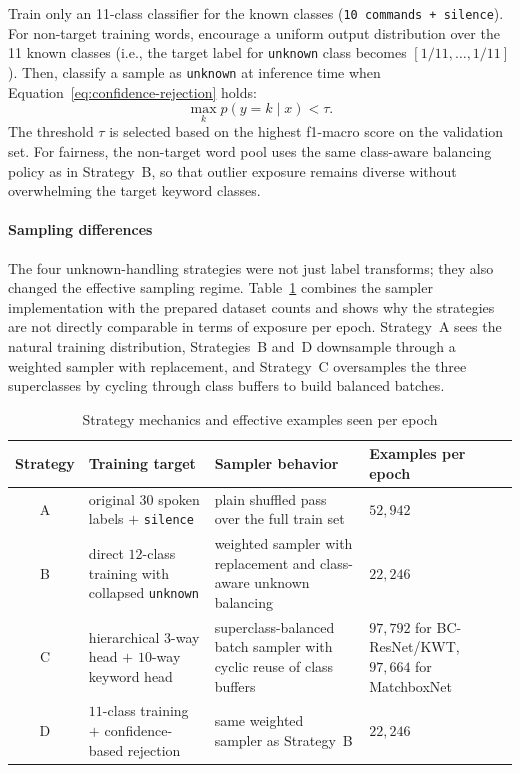 \documentclass[11pt]{article}
\begin{document}
Train only an 11-class classifier for the known classes (\texttt{10 commands + silence}). For non-target training words, encourage a uniform output distribution over the 11 known classes (i.e., the target label for \texttt{unknown} class becomes \([1/11, \dots, 1/11]\)). Then, classify a sample as \texttt{unknown} at inference time when Equation~\eqref{eq:confidence-rejection} holds:
\begin{equation}
\label{eq:confidence-rejection}
\max_k p(y = k \mid x) < \tau.
\end{equation}
The threshold \(\tau\) is selected based on the highest f1-macro score on the validation set. For fairness, the non-target word pool uses the same class-aware balancing policy as in Strategy~B, so that outlier exposure remains diverse without overwhelming the target keyword classes.


\paragraph*{Sampling differences}
The four unknown-handling strategies were not just label transforms; they also changed the effective sampling regime. Table~\ref{tab:strategy-mechanics} combines the sampler implementation with the prepared dataset counts and shows why the strategies are not directly comparable in terms of exposure per epoch. Strategy~A sees the natural training distribution, Strategies~B and~D downsample through a weighted sampler with replacement, and Strategy~C oversamples the three superclasses by cycling through class buffers to build balanced batches.

\begin{table}[h!]
\centering
\caption{Strategy mechanics and effective examples seen per epoch}
\label{tab:strategy-mechanics}
\smallskip
\small
\begin{tabularx}{\textwidth}{@{}c >{\raggedright\arraybackslash}X >{\raggedright\arraybackslash}X >{\centering\arraybackslash}p{2.4cm}@{}}
\toprule
\textbf{Strategy} & \textbf{Training target} & \textbf{Sampler behavior} & \textbf{Examples per epoch}\\
\midrule
A & original \(30\) spoken labels \(+\) \texttt{silence} & plain shuffled pass over the full train set & \(52{,}942\) \\
\midrule
B & direct \(12\)-class training with collapsed \texttt{unknown} & weighted sampler with replacement and class-aware unknown balancing & \(22{,}246\) \\
\midrule
C & hierarchical \(3\)-way head \(+\) \(10\)-way keyword head & superclass-balanced batch sampler with cyclic reuse of class buffers & \(97{,}792\) for BC-ResNet/KWT, \(97{,}664\) for MatchboxNet \\
\midrule
D & \(11\)-class training \(+\) confidence-based rejection & same weighted sampler as Strategy~B & \(22{,}246\) \\
\bottomrule
\end{tabularx}
\end{table}
\end{document}
